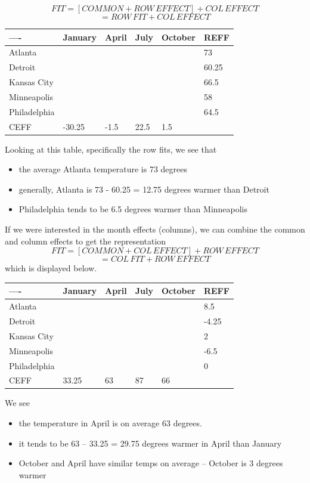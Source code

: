 \documentclass[
]{book}
\providecommand{\tightlist}{%
  \setlength{\itemsep}{0pt}\setlength{\parskip}{0pt}}
\begin{document}
\[
FIT = [COMMON + ROW \, EFFECT] + COL \, EFFECT
\]
\[
= ROW \, FIT + COL \, EFFECT
\]

\begin{longtable}[]{@{}llllll@{}}
\toprule
---- & January & April & July & October & REFF \\
\midrule
\endhead
Atlanta & & & & & 73 \\
Detroit & & & & & 60.25 \\
Kansas City & & & & & 66.5 \\
Minneapolis & & & & & 58 \\
Philadelphia & & & & & 64.5 \\
CEFF & -30.25 & -1.5 & 22.5 & 1.5 & \\
\bottomrule
\end{longtable}

Looking at this table, specifically the row fits, we see that

\begin{itemize}
\tightlist
\item
  the average Atlanta temperature is 73 degrees
\item
  generally, Atlanta is 73 - 60.25 = 12.75 degrees warmer than Detroit
\item
  Philadelphia tends to be 6.5 degrees warmer than Minneapolis
\end{itemize}

If we were interested in the month effects (columns), we can combine the common and column effects to get the representation
\[
FIT = [COMMON + COL \, EFFECT] + ROW \, EFFECT
\]
\[
= COL \, FIT + ROW \, EFFECT
\]
which is displayed below.

\begin{longtable}[]{@{}llllll@{}}
\toprule
---- & January & April & July & October & REFF \\
\midrule
\endhead
Atlanta & & & & & 8.5 \\
Detroit & & & & & -4.25 \\
Kansas City & & & & & 2 \\
Minneapolis & & & & & -6.5 \\
Philadelphia & & & & & 0 \\
CEFF & 33.25 & 63 & 87 & 66 & \\
\bottomrule
\end{longtable}

We see

\begin{itemize}
\tightlist
\item
  the temperature in April is on average 63 degrees.
\item
  it tends to be 63 -- 33.25 = 29.75 degrees warmer in April than January
\item
  October and April have similar temps on average -- October is 3 degrees warmer
\end{itemize}
\end{document}
